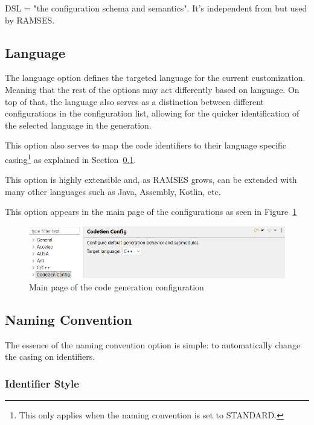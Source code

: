 \begin{tcolorbox}[colback=green!5, colframe=green!40!black] DSL = "the configuration schema and semantics".  
It's independent from but used by \gls{RAMSES}. \end{tcolorbox}

\subsection{Language}
\label{sec:dsl_lang}

The language option defines the targeted language for the current customization. Meaning that the rest of the options may act differently based on language. On top of that, the language also serves as a distinction between different configurations in the configuration list, allowing for the quicker identification of the selected language in the generation.

This option also serves to map the code \glspl{identifier} to their language specific casing\footnote{This only applies when the naming convention is set to STANDARD.} as explained in Section~\ref{sec:dsl_lang}.

This option is highly extensible and, as \gls{RAMSES} grows, can be extended with many other languages such as Java, Assembly, Kotlin, etc.

This option appears in the main page of the configurations as seen in Figure~\ref{fig:eclipse_config_main}

\begin{figure}[htbp]
	\centering
	\includegraphics[width=\textwidth]{eclipse_config_main.png}
	\caption{Main page of the code generation configuration}
	\label{fig:eclipse_config_main}
\end{figure}

\subsection{Naming Convention}
\label{sec:dsl_name}

The essence of the naming convention option is simple: to automatically change the casing on \glspl{identifier}.

\subsubsection{Identifier Style}
\label{sec:dsl_name_style}


